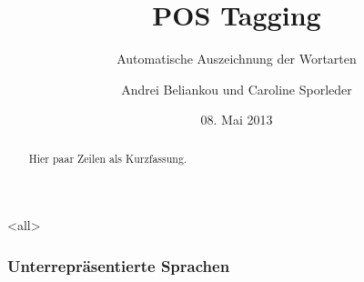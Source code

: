 
\usepackage[utf8]{inputenc}
\usepackage[T2A, T1]{fontenc}

\usepackage[russian, american, ngerman]{babel}
\usepackage{textcomp}              %
\usepackage{mathptmx}              %
\usepackage[scaled=.90]{helvet}    %
\usepackage{courier}               %
\usepackage{amsmath}               %
\usepackage{amsthm}                %

\usepackage{tabularx}

\usepackage{biblatex}


\usepackage{multicol}

\usepackage{graphicx}
\graphicspath{{images/}}

\usepackage{qtree}

\usepackage{hyperref}


\mode*

\mode<all>{
  \title[SRL]{POS Tagging}
  \subtitle{Automatische Auszeichnung der Wortarten}
  \author[A.\,Beliankou, C.\,Sporleder]{Andrei Beliankou und Caroline
    Sporleder}
  \date[08.05.2013]{08. Mai 2013}
}

\maketitle

\begin{abstract}
  Hier paar Zeilen als Kurzfassung.
\end{abstract}

\tableofcontents

\begin{frame}
  \titlepage
\end{frame}

\begin{frame}
  \frametitle{Unterrepräsentierte Sprachen}

\end{frame}

